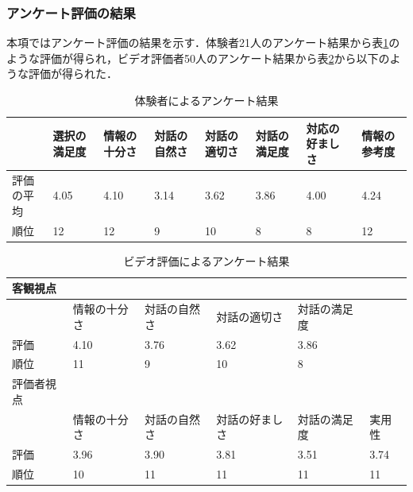 \subsubsection{アンケート評価の結果}
本項ではアンケート評価の結果を示す．体験者21人のアンケート結果から表\ref{result_taiken}のような評価が得られ，ビデオ評価者50人のアンケート結果から表\ref{result_video}から以下のような評価が得られた．

\begin{table}[hbtp]
    \caption{体験者によるアンケート結果}
    \label{result_taiken}
    \centering
    \begin{tabular}{l|l|l|l|l|l|l|l}
    \hline
          & 選択の満足度 & 情報の十分さ & 対話の自然さ & 対話の適切さ & 対話の満足度 & 対応の好ましさ & 情報の参考度 \\ \hline
    評価の平均 & 4.05   & 4.10   & 3.14   & 3.62   & 3.86   & 4.00    & 4.24   \\ \hline
    順位    & 12     & 12     & 9      & 10     & 8      & 8       & 12     \\ \hline
    \end{tabular}
\end{table}

\begin{table}[hbtp]
    \caption{ビデオ評価によるアンケート結果}
    \label{result_video}
    \centering
    \begin{tabular}{llllll}
    \hline
    客観視点                    &                             &                             &                              &                             &      \\ \hline
    \multicolumn{1}{l|}{}   & \multicolumn{1}{l|}{情報の十分さ} & \multicolumn{1}{l|}{対話の自然さ} & \multicolumn{1}{l|}{対話の適切さ}  & 対話の満足度                      &      \\ \hline
    \multicolumn{1}{l|}{評価} & \multicolumn{1}{l|}{4.10}   & \multicolumn{1}{l|}{3.76}   & \multicolumn{1}{l|}{3.62}    & 3.86                        &      \\ \hline
    \multicolumn{1}{l|}{順位} & \multicolumn{1}{l|}{11}     & \multicolumn{1}{l|}{9}      & \multicolumn{1}{l|}{10}      & 8                           &      \\ \hline
    評価者視点                   &                             &                             &                              &                             &      \\ \hline
    \multicolumn{1}{l|}{}   & \multicolumn{1}{l|}{情報の十分さ} & \multicolumn{1}{l|}{対話の自然さ} & \multicolumn{1}{l|}{対話の好ましさ} & \multicolumn{1}{l|}{対話の満足度} & 実用性  \\ \hline
    \multicolumn{1}{l|}{評価} & \multicolumn{1}{l|}{3.96}   & \multicolumn{1}{l|}{3.90}   & \multicolumn{1}{l|}{3.81}    & \multicolumn{1}{l|}{3.51}   & 3.74 \\ \hline
    \multicolumn{1}{l|}{順位} & \multicolumn{1}{l|}{10}     & \multicolumn{1}{l|}{11}     & \multicolumn{1}{l|}{11}      & \multicolumn{1}{l|}{11}     & 11   \\ \hline
    \end{tabular}
\end{table}
